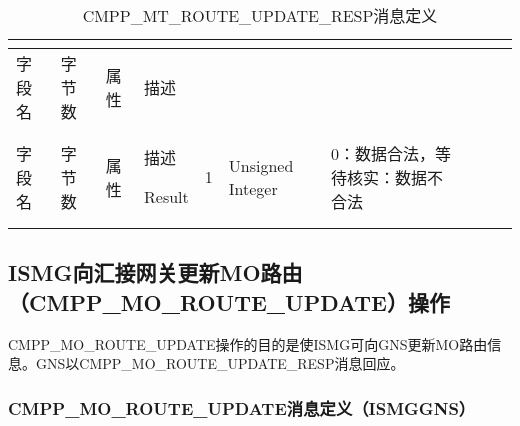 \documentclass[11pt]{book} %
\begin{document}
\begin{longtable}{|m{90pt}|m{35pt}|m{80pt}|m{200pt}|}
\tabularnewline\hline
字段名&字节数&属性&描述
\endhead

\caption{CMPP\_MT\_ROUTE\_UPDATE\_RESP消息定义}\\
\hline
字段名&字节数&属性&描述
\endfirsthead

\endfoot

\endlastfoot

\hline
Result&1&Unsigned Integer&0：数据合法，等待核实：数据不合法\\
\hline
\end{longtable}



\subsection{ISMG向汇接网关更新MO路由（CMPP\_MO\_ROUTE\_UPDATE）操作}

CMPP\_MO\_ROUTE\_UPDATE操作的目的是使ISMG可向GNS更新MO路由信息。GNS以CMPP\_MO\_ROUTE\_UPDATE\_RESP消息回应。

%
%
%
%
%



\subsubsection{CMPP\_MO\_ROUTE\_UPDATE消息定义（ISMG\textrightarrow GNS）}
\end{document}
